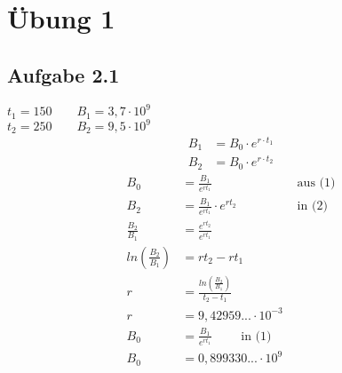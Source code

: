 







\maketitle
\newpage
\tableofcontents
\newpage


\section{Übung 1}

\subsection*{Aufgabe 2.1}

$t_1=150 \qquad B_1=3,7 \cdot 10^9$\\
$t_2=250 \qquad B_2=9,5 \cdot 10^9$\\

\begin{align}
B_1 &= B_0 \cdot e^{r\cdot t_1}\\
B_2 &= B_0 \cdot e^{r\cdot t_2}
\end{align}
\begin{align*}
B_0 &= \frac{B_1}{e^{r t_1}}  &\text{ aus (1)}\\
B_2 &= \frac{B_1}{e^{r t_1}} \cdot e^{r t_2}  &\text{ in (2)}\\
\frac{B_2}{B_1}&=\frac{e^{r t_2}}{e^{r t_1}}\\
ln(\frac{B_2}{B_1})&= r t_2 - r t_1\\
r&= \frac{ln (\frac{B_2}{B_1})}{t_2-t_1}\\
r&= 9,42959... \cdot 10^{-3}\\
B_0 &= \frac{B_1}{e^{r t_1}} \qquad\text{ in (1)}\\
B_0 &= 0,899330... \cdot 10^9 
\end{align*}

